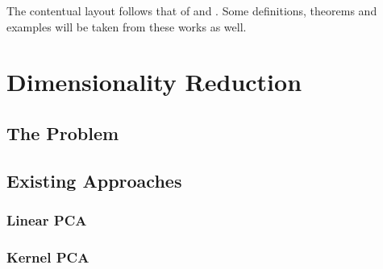 The contentual layout follows that of \cite{Coifman20065} and \cite{Belkin2003}. Some definitions, theorems and examples will be taken from these works as well.

\section{Dimensionality Reduction}

\subsection{The Problem}
\subsection{Existing Approaches}
\subsubsection{Linear PCA}
\subsubsection{Kernel PCA}
